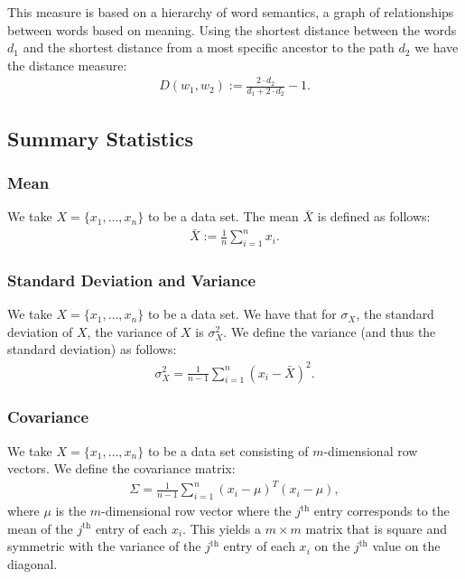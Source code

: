 This measure is based on a hierarchy of word semantics, a
graph of relationships between words based on meaning.
Using the shortest distance between the words $d_1$ and the 
shortest distance from a most specific ancestor to the path
$d_2$ we have the distance measure: \begin{gather*}
    D(w_1, w_2) := \frac{2 \cdot d_2}{d_1 + 2 \cdot d_2} - 1.
\end{gather*}

\subsection{Summary Statistics}

\subsubsection{Mean}

We take $X = \{x_1, \ldots, x_n\}$ to be a data set.
The mean $\bar{X}$ is defined as follows: \begin{gather*}
    \bar{X} := \frac{1}{n}\sum_{i = 1}^n x_i.
\end{gather*}

\subsubsection{Standard Deviation and Variance}

We take $X = \{x_1, \ldots, x_n\}$ to be a data set.
We have that for $\sigma_X$, the standard deviation of $X$,
the variance of $X$ is $\sigma_X^2$. We define the variance
(and thus the standard deviation) as follows: \begin{gather*}
    \sigma_X^2 = \frac{1}{n - 1}\sum_{i = 1}^n(x_i - \bar{X})^2.
\end{gather*} 

\subsubsection{Covariance}

We take $X = \{x_1, \ldots, x_n\}$ to be a data set consisting
of $m$-dimensional row vectors. We define the covariance matrix: 
\begin{gather*}
    \Sigma = \frac{1}{n - 1}\sum_{i = 1}^n (x_i - \mu)^T(x_i - \mu),
\end{gather*} where $\mu$ is the $m$-dimensional row vector
where the $j^{\text{th}}$ entry corresponds to the mean of the
$j^{\text{th}}$ entry of each $x_i$. This yields a $m \times m$
matrix that is square and symmetric with the variance of the
$j^{\text{th}}$ entry of each $x_i$ on the $j^{\text{th}}$ value
on the diagonal.

